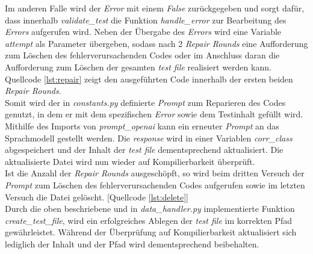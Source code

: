 \vspace{-.3cm}
Im anderen Falle wird der \textit{Error} mit einem \textit{False} zurückgegeben und sorgt dafür, dass innerhalb \textit{validate\_test} die Funktion \textit{handle\_error} zur Bearbeitung des \textit{Errors} aufgerufen wird. Neben der Übergabe des \textit{Errors} wird eine Variable \textit{attempt} als Parameter übergeben, sodass nach 2 \textit{Repair Rounds} eine Aufforderung zum Löschen des fehlerverursachenden Codes oder im Anschluss daran die Aufforderung zum Löschen der gesamten \textit{test file} realisiert werden kann. \\Quellcode \ref{lst:repair} zeigt den ausgeführten Code innerhalb der ersten beiden \textit{Repair Rounds}.\\
\vspace{-.3cm}
Somit wird der in \textit{constants.py} definierte \textit{Prompt} zum Reparieren des Codes genutzt, in dem er mit dem spezifischen \textit{Error} sowie dem Testinhalt gefüllt wird. Mithilfe des Imports von \textit{prompt\_openai} kann ein erneuter \textit{Prompt} an das Sprachmodell gestellt werden. Die \textit{response} wird in einer Variablen \textit{corr\_class} abgespeichert und der Inhalt der \textit{test file} dementsprechend aktualisiert. Die aktualisierte Datei wird nun wieder auf Kompilierbarkeit überprüft. \\Ist die Anzahl der \textit{Repair Rounds} ausgeschöpft, so wird beim dritten Versuch der \textit{Prompt} zum Löschen des fehlerverursachenden Codes aufgerufen sowie im letzten Versuch die Datei gelöscht. [Quellcode \ref{lst:delete}]\\
\vspace{-.3cm}
Durch die oben beschriebene und in \textit{data\_handler.py} implementierte Funktion \textit{create\_test\_file}, wird ein erfolgreiches Ablegen der \textit{test file} im korrekten Pfad gewährleistet. Während der Überprüfung auf Kompilierbarkeit aktualisiert sich lediglich der Inhalt und der Pfad wird dementsprechend beibehalten.

